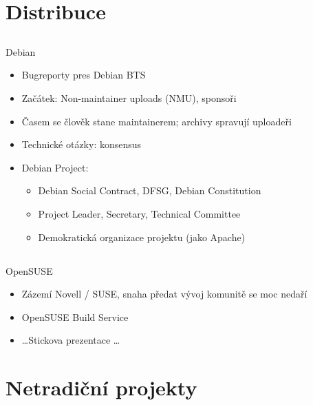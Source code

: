 \documentclass{beamer}
\begin{document}
\section{Distribuce}

\subsection{}
\begin{frame}{Debian}
\begin{itemize}
\item Bugreporty pres Debian BTS
\item Začátek: Non-maintainer uploads (NMU), sponsoři
\item Časem se člověk stane maintainerem; archivy spravují uploadeři
\item Technické otázky: konsensus
\item Debian Project:
	\begin{itemize}
	\item Debian Social Contract, DFSG, Debian Constitution
	\item Project Leader, Secretary, Technical Committee
	\item Demokratická organizace projektu (jako Apache)
	\end{itemize}
\end{itemize}
\end{frame}

\subsection{}
\begin{frame}{OpenSUSE}
\begin{itemize}
\item Zázemí Novell / SUSE, snaha předat vývoj komunitě se moc nedaří
\item OpenSUSE Build Service
\item \dots Stickova prezentace \dots
\end{itemize}
\end{frame}


\section{Netradiční projekty}
\end{document}
